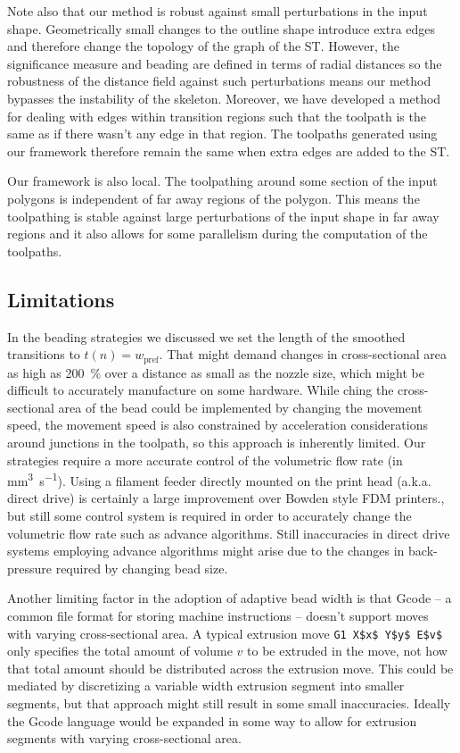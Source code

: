 Note also that our method is robust against small perturbations in the input shape.
Geometrically small changes to the outline shape introduce extra edges and therefore change the topology of the graph of the ST.
However, the significance measure and beading are defined in terms of radial distances so the robustness of the distance field against such perturbations means our method bypasses the instability of the skeleton.
Moreover, we have developed a method for dealing with edges within transition regions such that the toolpath is the same as if there wasn't any edge in that region.
The toolpaths generated using our framework therefore remain the same when extra edges are added to the ST.

Our framework is also local.
The toolpathing around some section of the input polygons is independent of far away regions of the polygon.
This means the toolpathing is stable against large perturbations of the input shape in far away regions
and it also allows for some parallelism during the computation of the toolpaths.



\subsection{Limitations}
In the beading strategies we discussed we set the length of the smoothed transitions to $t(n) = w_\text{pref}$.
That might demand changes in cross-sectional area as high as \SI{200}{\percent} over a distance as small as the nozzle size,
which might be difficult to accurately manufacture on some hardware.
While ching the cross-sectional area of the bead could be implemented by changing the movement speed, the movement speed is also constrained by acceleration considerations around junctions in the toolpath, so this approach is inherently limited.
Our strategies require a more accurate control of the volumetric flow rate (in \si{\milli\meter\cubed\per\second}).
Using a filament feeder directly mounted on the print head (a.k.a. direct drive) is certainly a large improvement over Bowden style FDM printers.,
but still some control system is required in order to accurately change the volumetric flow rate such as advance algorithms. \cite{tronvoll2019investigating}
Still inaccuracies in direct drive systems employing advance algorithms might arise due to the changes in back-pressure required by changing bead size.


Another limiting factor in the adoption of adaptive bead width is that Gcode -- a common file format for storing machine instructions -- doesn't support  moves with varying cross-sectional area.
A typical extrusion move \lstinline{G1 X$x$ Y$y$ E$v$} only specifies the total amount of volume $v$ to be extruded in the move, not how that total amount should be distributed across the extrusion move.
This could be mediated by discretizing a variable width extrusion segment into smaller segments, but that approach might still result in some small inaccuracies.
Ideally the Gcode language would be expanded in some way to allow for extrusion segments with varying cross-sectional area.


